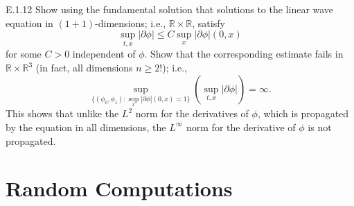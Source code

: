 \documentclass{article}
\begin{document}
\begin{prb}{E.1.12}
	Show using the fundamental solution that solutions to the linear wave equation in $(1 + 1)$-dimensions; i.e., $\mathbb{R} \times \mathbb{R}$, satisfy $$\sup_{t,x}|\partial \phi| \leq C\sup_{x}|\partial \phi|(0,x)$$ for some $C > 0$ independent of $\phi$. Show that the corresponding estimate fails in $\mathbb{R} \times \mathbb{R}^{3}$ (in fact, all dimensions $n \geq 2$!); i.e., 
	\begin{equation*}
		\sup_{\{(\phi_{0}, \phi_{1}): \sup_{x}|\partial\phi|(0,x) = 1\}}\left(\sup_{t,x}|\partial \phi|\right) = \infty. 
	\end{equation*} 
	This shows that unlike the $L^{2}$ norm for the derivatives of $\phi$, which is propagated by the equation in all dimensions, the $L^{\infty}$ norm for the derivative of $\phi$ is not propagated. 
\end{prb} 

\newpage 
\section{Random Computations} 
\end{document}
